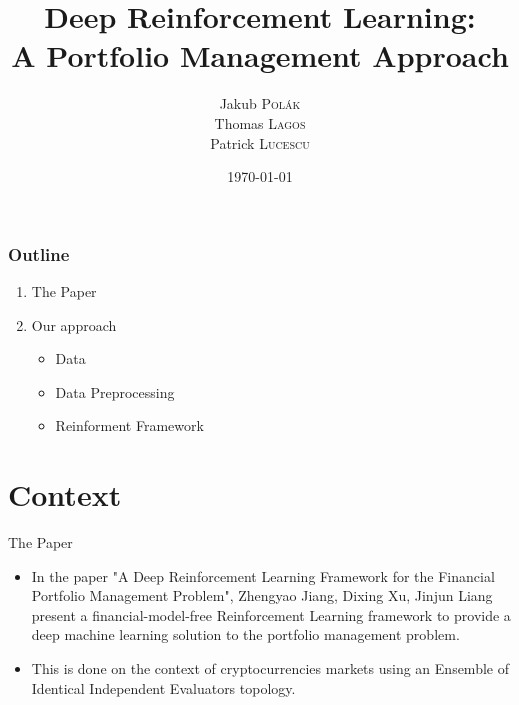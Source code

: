 \documentclass[10pt]{beamer}
\title[Deep Reinforcement Learning - A Portfolio Management Approach]{Deep Reinforcement Learning:\\ A Portfolio Management Approach}
\author[Polák, Lag, Lucescu]{ Jakub \textsc{Polák}\\
    Thomas \textsc{Lagos}\\
	Patrick \textsc{Lucescu}}
\institute[University of Zurich]{
	Deep Reinforcement Learning Seminar\\
	Drunk Policy}
\date[]{\today}
\begin{document}
\begin{frame}
  \titlepage
\end{frame}



\begin{frame}
\frametitle{Outline}
	\begin{enumerate}
		\item The Paper
		\item Our approach
		\begin{itemize}
		    \item Data 
		    \item Data Preprocessing
		    \item Reinforment Framework
		\end{itemize}
	\end{enumerate}
\end{frame}

\section{Context}


\begin{frame}{The Paper}
    \begin{itemize}
        \item In the paper "A Deep Reinforcement Learning Framework for the Financial Portfolio Management Problem", Zhengyao Jiang, Dixing Xu, Jinjun Liang present a financial-model-free Reinforcement Learning framework to provide a deep machine learning solution to the portfolio management problem.
        \item This is done on the context of cryptocurrencies markets using an Ensemble of Identical Independent Evaluators topology.
    \end{itemize}
\end{frame}
\end{document}
